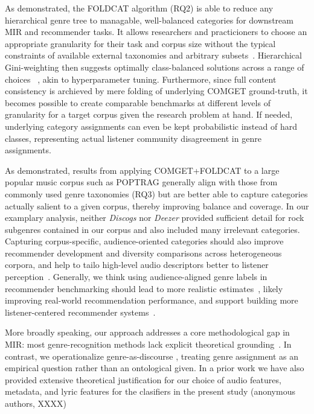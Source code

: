 \documentclass{article}
\begin{document}
As demonstrated, the FOLDCAT algorithm (RQ2) is able to reduce any hierarchical genre tree to managable, well-balanced categories for downstream MIR and recommender tasks. It allows researchers and practicioners to choose an appropriate granularity for their task and corpus size without the typical constraints of available external taxonomies and arbitrary subsets~\citep{greenCriticalSurveyResearch2024}. Hierarchical Gini-weighting then suggests optimally class-balanced solutions across a range of choices ~\citep{japkowiczClassImbalanceProblem2002}, akin to hyperparameter tuning. Furthermore, since full content consistency is archieved by mere folding of underlying COMGET ground-truth, it becomes possible to create comparable benchmarks at different levels of granularity for a target corpus given the research problem at hand. If needed, underlying category assignments can even be kept probabilistic instead of hard classes, representing actual listener community disagreement in genre assignments.

As demonstrated, results from applying COMGET+FOLDCAT to a large popular music corpus such as POPTRAG generally align with those from commonly used genre taxonomies  (RQ3) but are better able to capture categories actually salient to a given corpus, thereby improving balance and coverage. In our examplary analysis, neither \textit{Discogs} nor \textit{Deezer} provided sufficient detail for rock subgenres contained in our corpus and also included many irrelevant categories. Capturing corpus-specific, audience-oriented categories should also improve recommender development and diversity comparisons across heterogeneous corpora, and help to tailo high-level audio descriptors better to listener perception~\citep{flexerProblemLimitedInterrater2016}. Generally, we think using audience-aligned genre labels in recommender benchmarking should lead to more realistic estimates~\citep{greenCriticalSurveyResearch2024}, likely improving real-world recommendation performance, and support building more listener-centered recommender systems~\citep{deldjoo2024,porcaroDiversityDesignMusic2021}.

More broadly speaking, our approach addresses a core methodological gap in MIR: most genre-recognition methods lack explicit theoretical grounding~\citep{greenCriticalSurveyResearch2024}. In contrast, we operationalize genre-as-discourse \citep{foucaultArchaeologyKnowledge2013,nealeGenre1980}, treating genre assignment as an empirical question rather than an ontological given. In a prior work we have also provided extensive theoretical justification for our choice of audio features, metadata, and lyric features for the clasifiers in the present study (anonymous authors, XXXX)
\end{document}
